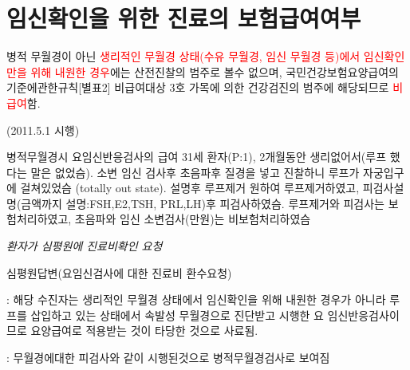 \section{임신확인을 위한 진료의 보험급여여부}
{%
병적 무월경이 아닌 \textcolor{red}{생리적인 무월경 상태(수유 무월경, 임신 무월경 등)에서 임신확인만을 위해 내원한 경우}에는 산전진찰의 범주로 볼수 없으며, 국민건강보험요양급여의기준에관한규칙[별표2] 비급여대상 3호 가목에 의한 건강검진의 범주에 해당되므로 \textcolor{red}{비급여}함.\par
(2011.5.1 시행)
}
\par
\medskip
{}

\par
\medskip
\begin{commentbox}{병적무월경시 요임신반응검사의 급여}
31세 환자(P:1), 2개월동안 생리없어서(루프 했다는 말은 없었슴). 소변 임신 검사후 초음파후 질경을 넣고 진찰하니 루프가 자궁입구에 걸쳐있었슴 (totally out state). 설명후 루프제거 원하여 루프제거하였고, 피검사설명(금액까지 설명:FSH,E2,TSH, PRL,LH)후 피검사하였슴. 루프제거와 피검사는 보험처리하였고, 초음파와 임신 소변검사(만원)는 비보험처리하였슴\par

\begin{center}\emph{환자가 심평원에 진료비확인 요청}\end{center}\par
심평원답변(요임신검사에 대한 진료비 환수요청) \par
: 해당 수진자는 생리적인 무월경 상태에서 임신확인을 위해 내원한 경우가 아니라 루프를 삽입하고 있는 상태에서 속발성 무월경으로 진단받고 시행한 요 임신반응검사이므로 요양급여로 적용받는 것이 타당한 것으로 사료됨. \par
: 무월경에대한 피검사와 같이 시행된것으로 병적무월경검사로 보여짐
\end{commentbox}

